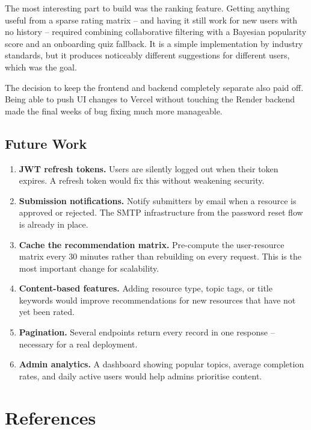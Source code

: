 \documentclass[12pt,a4paper]{report}
\begin{document}
The most interesting part to build was the ranking feature. Getting anything useful from a sparse rating matrix -- and having it still work for new users with no history -- required combining collaborative filtering with a Bayesian popularity score and an onboarding quiz fallback. It is a simple implementation by industry standards, but it produces noticeably different suggestions for different users, which was the goal.

The decision to keep the frontend and backend completely separate also paid off. Being able to push UI changes to Vercel without touching the Render backend made the final weeks of bug fixing much more manageable.

\section{Future Work}

\begin{enumerate}
  \item \textbf{JWT refresh tokens.} Users are silently logged out when their token expires. A refresh token would fix this without weakening security.
  \item \textbf{Submission notifications.} Notify submitters by email when a resource is approved or rejected. The SMTP infrastructure from the password reset flow is already in place.
  \item \textbf{Cache the recommendation matrix.} Pre-compute the user-resource matrix every 30 minutes rather than rebuilding on every request. This is the most important change for scalability.
  \item \textbf{Content-based features.} Adding resource type, topic tags, or title keywords would improve recommendations for new resources that have not yet been rated.
  \item \textbf{Pagination.} Several endpoints return every record in one response -- necessary for a real deployment.
  \item \textbf{Admin analytics.} A dashboard showing popular topics, average completion rates, and daily active users would help admins prioritise content.
\end{enumerate}

\newpage

\chapter*{References}
\end{document}
